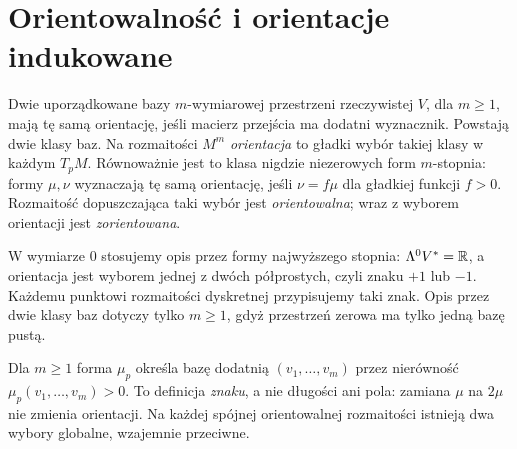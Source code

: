 \section{Orientowalność i orientacje indukowane}
\label{sec:formy-orientacja}

\begin{definicja}[Orientacja]
\label{def:orientacja-formy}
Dwie uporządkowane bazy $m$-wymiarowej przestrzeni
rzeczywistej $V$, dla $m\geq1$, mają tę samą orientację, jeśli
macierz przejścia ma dodatni wyznacznik.
Powstają dwie klasy baz. Na rozmaitości $M^m$
\emph{orientacja} to gładki wybór takiej klasy w
każdym $T_pM$. Równoważnie jest to klasa
nigdzie niezerowych form $m$-stopnia: formy
$\mu,\nu$ wyznaczają tę samą orientację, jeśli
$\nu=f\mu$ dla gładkiej funkcji $f>0$.
Rozmaitość dopuszczająca taki wybór jest
\emph{orientowalna}; wraz z wyborem orientacji
jest \emph{zorientowana}.
\end{definicja}

W wymiarze $0$ stosujemy opis przez formy najwyższego
stopnia: $\Lambda^0 V^*=\mathbb{R}$, a orientacja jest wyborem
jednej z dwóch półprostych, czyli znaku $+1$ lub $-1$.
Każdemu punktowi rozmaitości dyskretnej przypisujemy taki
znak. Opis przez dwie klasy baz dotyczy tylko $m\geq1$,
gdyż przestrzeń zerowa ma tylko jedną bazę pustą.

Dla $m\geq1$ forma $\mu_p$ określa bazę dodatnią $(v_1,\ldots,v_m)$
przez nierówność $\mu_p(v_1,\ldots,v_m)>0$.
To definicja \emph{znaku}, a nie długości ani pola:
zamiana $\mu$ na $2\mu$ nie zmienia orientacji.
Na każdej spójnej orientowalnej rozmaitości istnieją
dwa wybory globalne, wzajemnie przeciwne.

